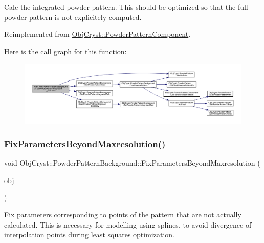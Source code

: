 Calc the integrated powder pattern. This should be optimized so that the full powder pattern is not explicitely computed. 

Reimplemented from \mbox{\hyperlink{class_obj_cryst_1_1_powder_pattern_component_a7825422fec4a6ee5f1a00bc4063104ef}{Obj\+Cryst\+::\+Powder\+Pattern\+Component}}.

Here is the call graph for this function\+:
\nopagebreak
\begin{figure}[H]
\begin{center}
\leavevmode
\includegraphics[width=350pt]{class_obj_cryst_1_1_powder_pattern_background_a044838d76b1878a029d587480636e80e_cgraph}
\end{center}
\end{figure}
\mbox{\label{class_obj_cryst_1_1_powder_pattern_background_a874e0bed05f17df53ad6ddd3df989dc9}} 
\subsubsection{\texorpdfstring{FixParametersBeyondMaxresolution()}{FixParametersBeyondMaxresolution()}}
{\footnotesize\ttfamily void Obj\+Cryst\+::\+Powder\+Pattern\+Background\+::\+Fix\+Parameters\+Beyond\+Maxresolution (\begin{DoxyParamCaption}\item[{Refinable\+Obj \&}]{obj }\end{DoxyParamCaption})}

Fix parameters corresponding to points of the pattern that are not actually calculated. This is necessary for modelling using splines, to avoid divergence of interpolation points during least squares optimization.


